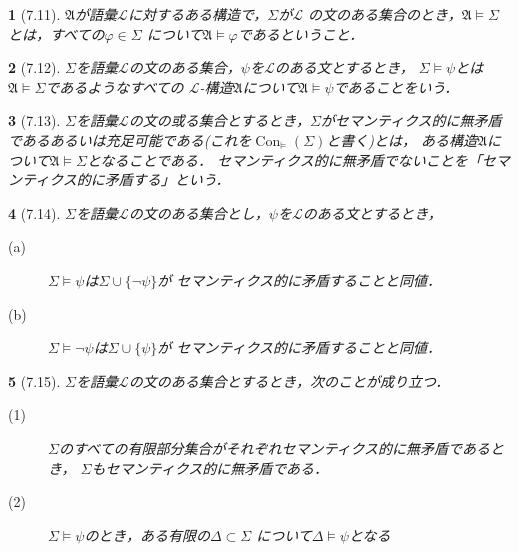 \documentclass[a4j,10.5pt,oneside,openany]{jsbook}
\theoremstyle{mystyle}
\newtheorem{thm}{\color{DarkMidnightBlue}{定理}}[section]
\newtheorem{dfn}[thm]{\color{PakistanGreen}{定義}}
\newcommand{\Con}{\operatorname{Con}} %
\begin{document}
	\begin{screen}
		\begin{dfn}[7.11]
			$\mathfrak{A}$が語彙$\mathcal{L}$に対するある構造で，$\Sigma$が$\mathcal{L}$
			の文のある集合のとき，$\mathfrak{A} \models \Sigma$とは，すべての$\varphi \in \Sigma$
			について$\mathfrak{A} \models \varphi$であるということ．
		\end{dfn}
	\end{screen}
	
	\begin{screen}
		\begin{dfn}[7.12]
			$\Sigma$を語彙$\mathcal{L}$の文のある集合，$\psi$を$\mathcal{L}$のある文とするとき，
			$\Sigma \models \psi$とは$\mathfrak{A} \models \Sigma$であるようなすべての
			$\mathcal{L}$-構造$\mathfrak{A}$について$\mathfrak{A} \models \psi$であることをいう．
		\end{dfn}
	\end{screen}
	
	\begin{screen}
		\begin{dfn}[7.13]
			$\Sigma$を語彙$\mathcal{L}$の文の或る集合とするとき，$\Sigma$がセマンティクス的に無矛盾
			であるあるいは充足可能である(これを$\Con_{\models}(\Sigma)$と書く)とは，
			ある構造$\mathfrak{A}$について$\mathfrak{A} \models \Sigma$となることである．
			セマンティクス的に無矛盾でないことを「セマンティクス的に矛盾する」という．
		\end{dfn}
	\end{screen}
	
	\begin{screen}
		\begin{thm}[7.14]
			$\Sigma$を語彙$\mathcal{L}$の文のある集合とし，$\psi$を$\mathcal{L}$のある文とするとき，
			\begin{description}
				\item[(a)] $\Sigma \models \psi$は$\Sigma \cup \{\neg \psi\}$が
					セマンティクス的に矛盾することと同値．
				\item[(b)] $\Sigma \models \neg \psi$は$\Sigma \cup \{\psi\}$が
					セマンティクス的に矛盾することと同値．
			\end{description}
		\end{thm}
	\end{screen}
	
	\begin{screen}
		\begin{thm}[7.15]
			$\Sigma$を語彙$\mathcal{L}$の文のある集合とするとき，次のことが成り立つ．
			\begin{description}
				\item[(1)] $\Sigma$のすべての有限部分集合がそれぞれセマンティクス的に無矛盾であるとき，
					$\Sigma$もセマンティクス的に無矛盾である．
				\item[(2)] $\Sigma \models \psi$のとき，ある有限の$\Delta \subset \Sigma$
					について$\Delta \models \psi$となる
			\end{description}
		\end{thm}
	\end{screen}
	
\end{document}

